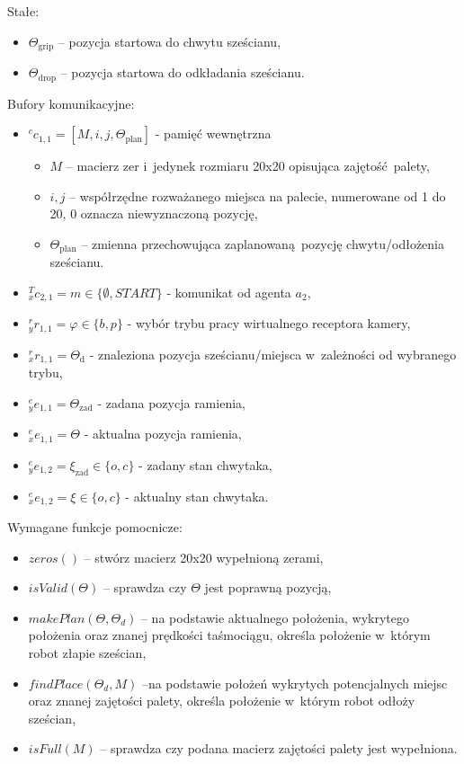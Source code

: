 Stałe:\begin{itemize}
    \item $\Theta_{\mathrm{grip}}$ -- pozycja startowa do chwytu sześcianu, 
    \item $\Theta_{\mathrm{drop}}$ -- pozycja startowa do odkładania sześcianu.
\end{itemize}

Bufory komunikacyjne:
\begin{itemize}
    \item ${}^{c}c_{1,1} = [M, i, j, \Theta_{\mathrm{plan}}]$ - pamięć wewnętrzna \begin{itemize}
        \item $M$ -- macierz zer i~jedynek rozmiaru 20x20 opisująca zajętość palety,
        \item $i,j$ -- współrzędne rozważanego miejsca na palecie, numerowane od 1 do 20, 0 oznacza niewyznaczoną pozycję,
        \item $\Theta_{\mathrm{plan}}$ -- zmienna przechowująca zaplanowaną pozycję chwytu/odłożenia sześcianu.
    \end{itemize}
    
    \item ${}^{T}_{x}c_{2,1} = m \in \{ \emptyset, START \}$ - komunikat od agenta $a_{2}$,
    
    \item ${}^{r}_{y}r_{1,1} = \varphi \in \{b, p\}$ - wybór trybu pracy wirtualnego receptora kamery,
    \item ${}^{r}_{x}r_{1,1} = \Theta_{\mathrm{d}}$ - znaleziona pozycja sześcianu/miejsca w~zależności od wybranego trybu,

    \item ${}^{e}_{y}e_{1,1} = \Theta_{\mathrm{zad}}$ - zadana pozycja ramienia,
    \item ${}^{e}_{x}e_{1,1} = \Theta$ - aktualna pozycja ramienia,

    \item ${}^{e}_{y}e_{1,2} = \xi_{\mathrm{zad}} \in \{o, c\}$ - zadany stan chwytaka,
    \item ${}^{e}_{x}e_{1,2} = \xi \in \{o, c\}$ - aktualny stan chwytaka.
\end{itemize}

Wymagane funkcje pomocnicze:
\begin{itemize}
    \item $zeros()$ -- stwórz macierz 20x20 wypełnioną zerami,
    \item $isValid(\Theta)$ -- sprawdza czy $\Theta$ jest poprawną pozycją,
    \item $makePlan(\Theta, \Theta_{d})$ -- na podstawie aktualnego położenia, wykrytego położenia oraz znanej prędkości taśmociągu, określa położenie w~którym robot złapie sześcian, 
    \item $findPlace(\Theta_{d}, M)$ --na podstawie położeń wykrytych potencjalnych miejsc oraz znanej zajętości palety, określa położenie w~którym robot odłoży sześcian,
    \item $isFull(M)$ -- sprawdza czy podana macierz zajętości palety jest wypełniona.
\end{itemize}


